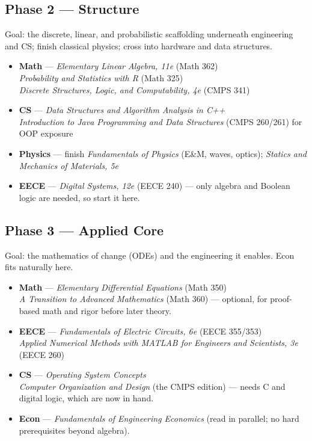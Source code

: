 \documentclass[11pt]{article}
\newcommand{\track}[2]{\textcolor{#1}{\textbf{#2}}}
\newcommand{\book}[1]{\textit{#1}}
\begin{document}
\newpage
\subsection*{Phase 2 --- Structure}
Goal: the discrete, linear, and probabilistic scaffolding underneath
engineering and CS; finish classical physics; cross into hardware and
data structures.
\begin{itemize}[leftmargin=1.2em, itemsep=2pt]
  \item \track{mathcol}{Math} --- \book{Elementary Linear Algebra, 11e}
        (Math 362) \\
        \book{Probability and Statistics with R} (Math 325) \\
        \book{Discrete Structures, Logic, and Computability, 4e} (CMPS 341)
  \item \track{cscol}{CS} --- \book{Data Structures and Algorithm Analysis
        in C++} \\
        \book{Introduction to Java Programming and Data Structures}
        (CMPS 260/261) for OOP exposure
  \item \track{phycol}{Physics} --- finish \book{Fundamentals of Physics}
        (E\&M, waves, optics); \book{Statics and Mechanics of Materials, 5e}
  \item \track{eececol}{EECE} --- \book{Digital Systems, 12e} (EECE 240) ---
        only algebra and Boolean logic are needed, so start it here.
\end{itemize}

\subsection*{Phase 3 --- Applied Core}
Goal: the mathematics of change (ODEs) and the engineering it enables.
Econ fits naturally here.
\begin{itemize}[leftmargin=1.2em, itemsep=2pt]
  \item \track{mathcol}{Math} --- \book{Elementary Differential Equations}
        (Math 350) \\
        \book{A Transition to Advanced Mathematics} (Math 360) --- optional,
        for proof-based math and rigor before later theory.
  \item \track{eececol}{EECE} --- \book{Fundamentals of Electric Circuits, 6e}
        (EECE 355/353) \\
        \book{Applied Numerical Methods with MATLAB for Engineers and
        Scientists, 3e} (EECE 260)
  \item \track{cscol}{CS} --- \book{Operating System Concepts} \\
        \book{Computer Organization and Design} (the CMPS edition) ---
        needs C and digital logic, which are now in hand.
  \item \track{econcol}{Econ} --- \book{Fundamentals of Engineering Economics}
        (read in parallel; no hard prerequisites beyond algebra).
\end{itemize}
\end{document}
